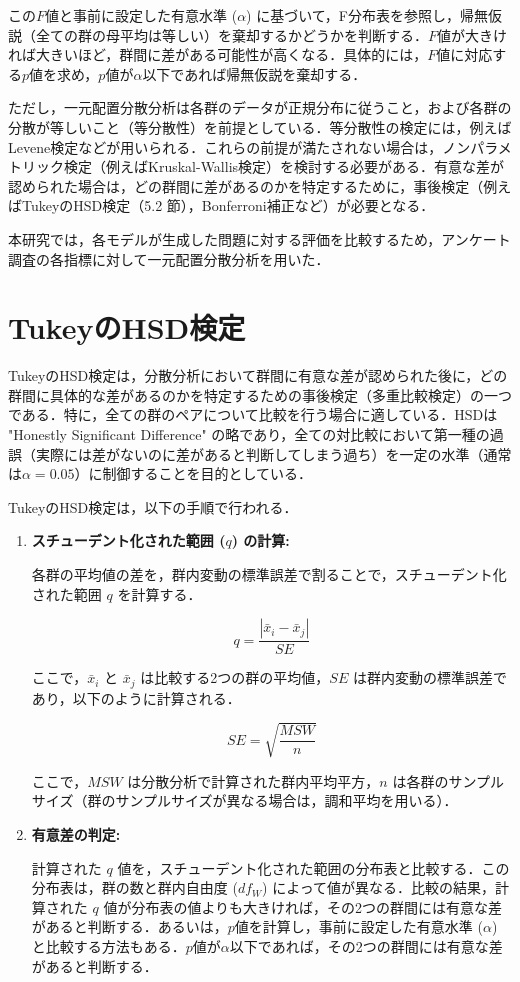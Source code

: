 \documentclass[11pt]{jreport}
\begin{document}
この$F$値と事前に設定した有意水準 ($\alpha$) に基づいて，F分布表を参照し，帰無仮説（全ての群の母平均は等しい）を棄却するかどうかを判断する．$F$値が大きければ大きいほど，群間に差がある可能性が高くなる．具体的には，$F$値に対応する$p$値を求め，$p$値が$\alpha$以下であれば帰無仮説を棄却する．

ただし，一元配置分散分析は各群のデータが正規分布に従うこと，および各群の分散が等しいこと（等分散性）を前提としている．等分散性の検定には，例えばLevene検定などが用いられる．これらの前提が満たされない場合は，ノンパラメトリック検定（例えばKruskal-Wallis検定）を検討する必要がある．有意な差が認められた場合は，どの群間に差があるのかを特定するために，事後検定（例えばTukeyのHSD検定（5.2
節），Bonferroni補正など）が必要となる．

本研究では，各モデルが生成した問題に対する評価を比較するため，アンケート調査の各指標に対して一元配置分散分析を用いた．

\section{TukeyのHSD検定}
TukeyのHSD検定は，分散分析において群間に有意な差が認められた後に，どの群間に具体的な差があるのかを特定するための事後検定（多重比較検定）の一つである．特に，全ての群のペアについて比較を行う場合に適している．HSDは "Honestly Significant Difference" の略であり，全ての対比較において第一種の過誤（実際には差がないのに差があると判断してしまう過ち）を一定の水準（通常は$\alpha = 0.05$）に制御することを目的としている．

TukeyのHSD検定は，以下の手順で行われる．

\begin{enumerate}
    \item \textbf{スチューデント化された範囲 ($q$) の計算:}

    各群の平均値の差を，群内変動の標準誤差で割ることで，スチューデント化された範囲 $q$ を計算する．

    \begin{equation}
    q = \frac{|\bar{x}_i - \bar{x}_j|}{SE}
    \end{equation}

    ここで，$\bar{x}_i$ と $\bar{x}_j$ は比較する2つの群の平均値，$SE$ は群内変動の標準誤差であり，以下のように計算される．

    \begin{equation}
    SE = \sqrt{\frac{MSW}{n}}
    \end{equation}

    ここで，$MSW$ は分散分析で計算された群内平均平方，$n$ は各群のサンプルサイズ（群のサンプルサイズが異なる場合は，調和平均を用いる）．

    \item \textbf{有意差の判定:}

    計算された $q$ 値を，スチューデント化された範囲の分布表と比較する．この分布表は，群の数と群内自由度 ($df_W$) によって値が異なる．比較の結果，計算された $q$ 値が分布表の値よりも大きければ，その2つの群間には有意な差があると判断する．あるいは，$p$値を計算し，事前に設定した有意水準 ($\alpha$) と比較する方法もある．$p$値が$\alpha$以下であれば，その2つの群間には有意な差があると判断する．
    
\end{enumerate}
\end{document}

